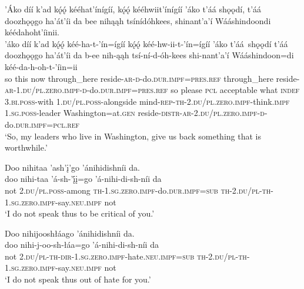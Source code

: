 \ea\label{ex:text7-17-16}
’Áko díí k’ad kǫ́ǫ́ kééhat’ínígíí, kǫ́ǫ́ kééhwiit’ínígíí ’áko t’áá shǫǫdí, t’áá doozhǫǫgo ha’át’íi da bee nihąąh tsínídóhkees, shinant’a’í Wááshindoondi kéédahoht’íinii.\\
\gll ’áko	díí	k’ad	kǫ́ǫ́	kéé-ha-t-’ín=ígíí	kǫ́ǫ́	kéé-hw-ii-t-’ín=ígíí	’áko	t’áá~{shǫǫdí}	t’áá	doozhǫǫgo	ha’át’íi	da	b-ee	nih-ąąh	tsí-ní-d-óh-kees	shi-nant’a’í	Wááshindoon=di	kéé-da-h-oh-t-’íin=ii\\
     so	this	now	through\_here	reside-\textsc{ar}-\textsc{d}-do.\textsc{dur}.\textsc{impf}=\textsc{pres}.\textsc{ref}	through\_here	reside-\textsc{ar}-1.\textsc{du}/\textsc{pl}.\textsc{zero}.\textsc{impf}-\textsc{d}-do.\textsc{dur}.\textsc{impf}=\textsc{pres}.\textsc{ref}	so	please	\textsc{pcl}	acceptable	what	\textsc{indef}	3.\textsc{bi}.\textsc{poss}-with	1.\textsc{du}/\textsc{pl}.\textsc{poss}-alongside	mind-\textsc{rep}-\textsc{th}-2.\textsc{du}/\textsc{pl}.\textsc{zero}.\textsc{impf}-think.\textsc{impf}	1.\textsc{sg}.\textsc{poss}-leader	Washington=at.\textsc{gen}	reside-\textsc{distr}-\textsc{ar}-2.\textsc{du}/\textsc{pl}.\textsc{zero}.\textsc{impf}-\textsc{d}-do.\textsc{dur}.\textsc{impf}=\textsc{pcl}.\textsc{ref}\\
\glt `So, my leaders who live in Washington, give us back something that is worthwhile.'
\z

\ea\label{ex:text7-17-17}
Doo nihitaa ’ash’į’go ’ánihidishníi da.\\
\gll doo	nihi-taa	’á-sh-’į́į=go	’á-nihi-di-sh-níi	da\\
     not	2.\textsc{du}/\textsc{pl}.\textsc{poss}-among	\textsc{th}-1.\textsc{sg}.\textsc{zero}.\textsc{impf}-do.\textsc{dur}.\textsc{impf}=\textsc{sub}	\textsc{th}-2.\textsc{du}/\textsc{pl}-\textsc{th}-1.\textsc{sg}.\textsc{zero}.\textsc{impf}-say.\textsc{neu}.\textsc{impf}	not\\
\glt `I do not speak thus to be critical of you.'
\z

\ea\label{ex:text7-17-18}
Doo nihijooshłáago ’ánihidishníi da.\\
\gll doo	nihi-j-oo-sh-łáa=go	’á-nihi-di-sh-níi	da\\
     not	2.\textsc{du}/\textsc{pl}-\textsc{th}-\textsc{dir}-1.\textsc{sg}.\textsc{zero}.\textsc{impf}-hate.\textsc{neu}.\textsc{impf}=\textsc{sub}	\textsc{th}-2.\textsc{du}/\textsc{pl}-\textsc{th}-1.\textsc{sg}.\textsc{zero}.\textsc{impf}-say.\textsc{neu}.\textsc{impf}	not\\
\glt `I do not speak thus out of hate for you.'
\z

